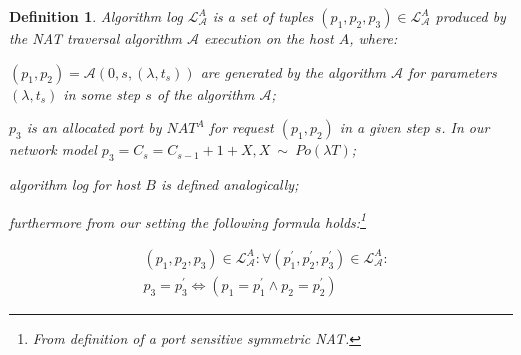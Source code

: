 \documentclass{acm_proc_article-sp}
\newtheorem{mydef}{Definition}
\begin{document}
\begin{mydef}
\label{def:log}
Algorithm log $\mathcal{L}^A_{\mathcal{A}}$ is a set of tuples $(p_1, p_2, p_3) \in \mathcal{L}^A_{\mathcal{A}}$ produced
by the NAT traversal algorithm $\mathcal{A}$ execution on the host $A$, where: \\

\begin{compactitem}
 \item $(p_1, p_2) = \mathcal{A}(0, s, (\lambda, t_s)) $ are generated by the algorithm $\mathcal{A}$ for  
       parameters $(\lambda, t_s)$ in some step $s$ of the algorithm $\mathcal{A}$;
 \item $p_3$ is an allocated port by $NAT^A$ for request $(p_1, p_2)$ in a given step $s$. In our network model
       $p_3=C_s=C_{s-1} + 1 + X, X~\sim~Po(\lambda T)$;
 \item algorithm log for host $B$ is defined analogically;
 \item furthermore from our setting the following formula holds:\footnote{From definition of a port sensitive symmetric NAT.}
\end{compactitem} %
%
%
\begin{align*}
& (p_1, p_2, p_3) \in \mathcal{L}^A_{\mathcal{A}}: \forall (p_1^{\prime}, p_2^{\prime}, p_3^{\prime}) \in \mathcal{L}^{A}_{\mathcal{A}} :\\
& p_3 = p_3^{\prime} \Leftrightarrow \left( p_1=p^{\prime}_1 \wedge p_2=p^{\prime}_2 \right)
\end{align*}
\end{mydef}
\end{document}
